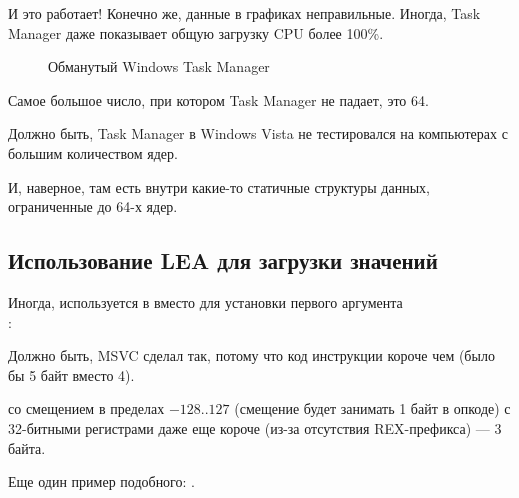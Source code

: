 И это работает!
Конечно же, данные в графиках неправильные.
Иногда, Task Manager даже показывает общую загрузку CPU более 100\%.

\begin{figure}[H]
\centering
{}
\caption{Обманутый Windows Task Manager}
\end{figure}

Самое большое число, при котором Task Manager не падает, это 64.

Должно быть, Task Manager в Windows Vista не тестировался на компьютерах с большим количеством ядер.

И, наверное, там есть внутри какие-то статичные структуры данных, ограниченные до 64-х ядер.

\subsection{Использование LEA для загрузки значений}
\label{TaskMgr_LEA}

Иногда,  используется в  вместо  для установки первого аргумента \\
:



Должно быть, \ac{MSVC} сделал так, потому что код инструкции  короче чем  (было бы 5 байт вместо 4).

 со смещением в пределах $-128..127$ (смещение будет занимать 1 байт в опкоде) с 32-битными регистрами даже еще короче (из-за отсутствия REX-префикса) --- 3 байта.

Еще один пример подобного: .
